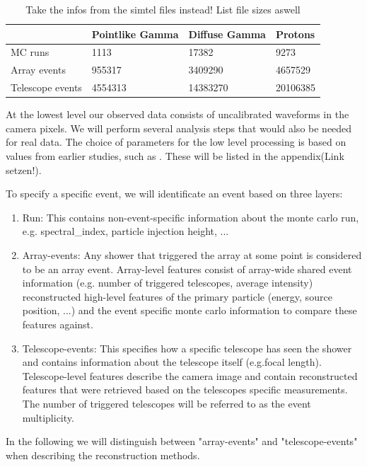 \begin{table}
    \begin{center}
        \begin{tabular}{| l | l | l | l |}
            \hline
            & Pointlike Gamma & Diffuse Gamma & Protons \\
            \hline
            MC runs & \num{1113} & \num{17382} &  \num{9273} \\ 
            \hline
            Array events & \num{955317} & \num{3409290} & \num{4657529} \\
            \hline
            Telescope events & \num{4554313} & \num{14383270} & \num{20106385} \\
            \hline
        \end{tabular}
    \end{center}
    \caption{Take the infos from the simtel files instead! List file sizes aswell}
    \label{tab:mc_infos}
\end{table}
At the lowest level our observed data consists of uncalibrated waveforms 
in the camera pixels.
We will perform several analysis steps that would also be needed for real data.
The choice of parameters for the low level processing 
is based on values from earlier studies, such as \cite{kai_diss}.
These will be listed in the appendix(Link setzen!).

To specify a specific event, we will identificate an event based on 
three layers:
\begin{enumerate}
    \item{Run: This contains non-event-specific information about the monte carlo run, e.g.
    spectral\_index, particle injection height, ...}
    \item{Array-events: Any shower that triggered the array at some point 
    is considered to be an array event.
    Array-level features consist of array-wide shared event information 
    (e.g. number of triggered telescopes, average intensity)
    reconstructed high-level features of the primary particle (energy, source position, ...) and the 
    event specific monte carlo information to compare these features against.}
    \item{Telescope-events: This specifies how a specific telescope has seen the shower and
    contains information about the telescope itself (e.g.focal length). Telescope-level features 
    describe the camera image and contain reconstructed features that were retrieved based on 
    the telescopes specific measurements. The number of triggered telescopes will be referred
    to as the event multiplicity.}
\end{enumerate}
In the following we will 
distinguish between "array-events" and "telescope-events" when describing the reconstruction methods.

